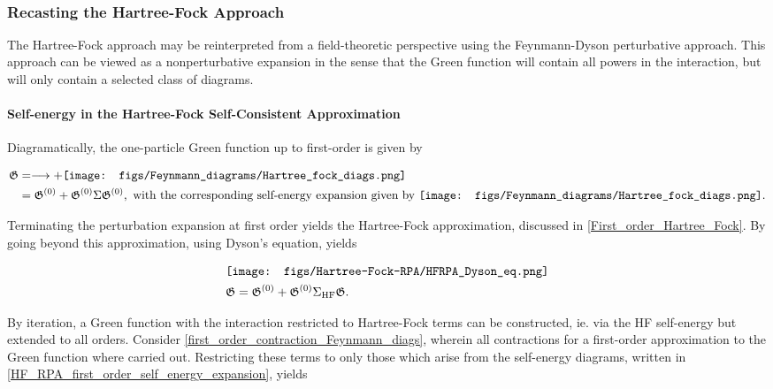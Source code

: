 \documentclass{homework}
\begin{document}
\blanky \\

\subsubsection{Recasting the Hartree-Fock Approach}

The Hartree-Fock approach may be reinterpreted from a field-theoretic perspective using the Feynmann-Dyson perturbative approach. This approach can be viewed as a nonperturbative expansion in the sense that the Green function will contain all powers in the interaction, but will only contain a selected class of diagrams. \\

\paragraph{Self-energy in the Hartree-Fock Self-Consistent Approximation}

Diagramatically, the one-particle Green function up to first-order is given by 

\begin{equation}
    \begin{split}
        \mathfrak{G} &= \longrightarrow +  \texttt{[image: figs/Feynmann\_diagrams/Hartree\_fock\_diags.png]} \\
        &= \mathfrak{G}^{(0)} + \mathfrak{G}^{(0)} \Sigma \mathfrak{G}^{(0)}, \textnormal{ with the corresponding self-energy expansion given by } \texttt{[image: figs/Feynmann\_diagrams/Hartree\_fock\_diags.png]}.
    \end{split}
    \label{HF_RPA_first_order_self_energy_expansion}
\end{equation}

Terminating the perturbation expansion at first order yields the Hartree-Fock approximation, discussed in \cref{First_order_Hartree_Fock}. By going beyond this approximation, using Dyson's equation, yields 

\begin{equation}
    \begin{split}   
    &\texttt{[image: figs/Hartree-Fock-RPA/HFRPA\_Dyson\_eq.png]} \\
    &\mathfrak{G} = \mathfrak{G}^{(0)} + \mathfrak{G}^{(0)} \Sigma_{\textnormal{HF}}\mathfrak{G}. 
    \end{split}
\end{equation}

By iteration, a Green function with the interaction restricted to Hartree-Fock terms can be constructed, ie. via the HF self-energy but extended to all orders. Consider \cref{first_order_contraction_Feynmann_diags}, wherein all contractions for a first-order approximation to the Green function where carried out. Restricting these terms to only those which arise from the self-energy diagrams, written in 
\cref{HF_RPA_first_order_self_energy_expansion}, yields
\end{document}
